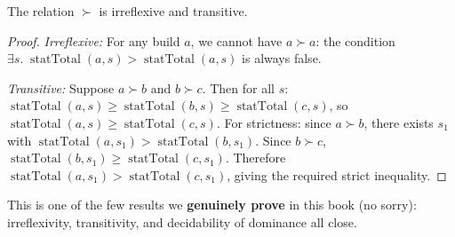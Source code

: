 \documentclass[11pt, a4paper, oneside]{book}
\newcommand{\statTotal}{\operatorname{statTotal}}
\newcommand{\li}[1]{{\ttfamily\small\color{deepblue}#1}}
\begin{document}
\begin{propbox}[title={Pareto Dominance is a Strict Partial Order}]
The relation $\succ$ is irreflexive and transitive.
\end{propbox}

\begin{proof}
\emph{Irreflexive:} For any build $a$, we cannot have $a \succ a$:
the condition $\exists s.\; \statTotal(a, s) > \statTotal(a, s)$ is
always false.

\emph{Transitive:} Suppose $a \succ b$ and $b \succ c$.  Then for all $s$:
$\statTotal(a, s) \geq \statTotal(b, s) \geq \statTotal(c, s)$, so
$\statTotal(a, s) \geq \statTotal(c, s)$.  For strictness: since $a \succ b$,
there exists $s_1$ with $\statTotal(a, s_1) > \statTotal(b, s_1)$.  Since
$b \succ c$, $\statTotal(b, s_1) \geq \statTotal(c, s_1)$.  Therefore
$\statTotal(a, s_1) > \statTotal(c, s_1)$, giving the required strict
inequality.
\end{proof}

This is one of the few results we \textbf{genuinely prove} in this book (no
\li{sorry}): irreflexivity, transitivity, and decidability of dominance all
close.
\end{document}
